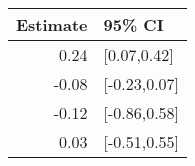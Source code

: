 \begin{tabular}{rl}
  \hline
Estimate & 95\% CI \\ 
  \hline
0.24 & [0.07,0.42] \\ 
  -0.08 & [-0.23,0.07] \\ 
  -0.12 & [-0.86,0.58] \\ 
  0.03 & [-0.51,0.55] \\ 
   \hline
\end{tabular}

